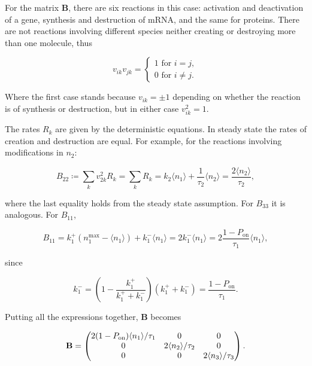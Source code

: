 For the matrix $\mathbf{B}$, there are six reactions in this case: activation and deactivation of a gene, synthesis and destruction of mRNA, and the same for proteins. There are not reactions involving different species neither creating or destroying more than one molecule, thus

\begin{equation*}
  v_{ik}v_{jk} = 
  \begin{cases}
    1 \text{ for } i = j,\\
    0 \text{ for } i\neq j.
  \end{cases}
\end{equation*}

Where the first case stands because  $v_{ik} =\pm 1$ depending on whether the reaction is of synthesis or destruction, but in either case $v_{ik}^2 = 1$.

The rates $R_k$ are given by the deterministic equations. In steady state the rates of creation and destruction are equal. For example, for the reactions involving modifications in $n_2$:

\begin{equation*}
  B_{22} \coloneqq \sum_kv_{2k}^2R_k = \sum_kR_k = k_2\langle n_1\rangle + \frac{1}{\tau_2}\langle n_2\rangle = \frac{2\langle n_2\rangle}{\tau_2},
\end{equation*}

where the last equality holds from the steady state assumption. For $B_{33}$ it is analogous. For $B_{11}$,

\begin{equation*}
  B_{11} = k_1^+(n_1^\text{max}-\langle n_1\rangle)+k_1^-\langle n_1\rangle = 2k_1^-\langle n_1\rangle = 2\frac{1-P_\text{on}}{\tau_1}\langle n_1\rangle,
\end{equation*}

since

\begin{equation*}
  k_1^- = \left(1-\frac{k_1^+}{k_1^++k_1^-}\right)(k_1^++k_1^-)=\frac{1-P_\text{on}}{\tau_1}.
\end{equation*}

Putting all the expressions together, $\mathbf{B}$ becomes

\begin{equation}
  \label{eq:fdt-B}
  \mathbf{B} = 
  \begin{pmatrix}
    2(1-P_\text{on})\langle n_1\rangle/\tau_1 & 0 & 0 \\
    0 & 2\langle n_2\rangle/\tau_2 & 0 \\
    0 & 0 & 2\langle n_3\rangle/\tau_3
  \end{pmatrix}.\\
\end{equation}

